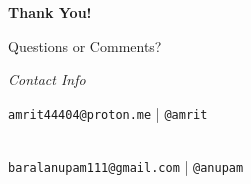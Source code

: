 \documentclass[14pt, aspectratio=169]{beamer}
\begin{document}
\begin{frame}[plain]
	\begin{center}
		\vfill
		{\Huge\bfseries Thank You! \par}
		\vspace{1.5cm}
		{\Large Questions or Comments?} \par
		\vspace{0.5cm}
		\textit{Contact Info} \par
		\vspace{0.3cm}
		\texttt{amrit44404@proton.me} \quad | \quad \texttt{@amrit} \quad \par\\
		\texttt{baralanupam111@gmail.com} \quad | \quad \texttt{@anupam} \quad \par



		\vfill


\end{center}
\end{frame}
\end{document}
